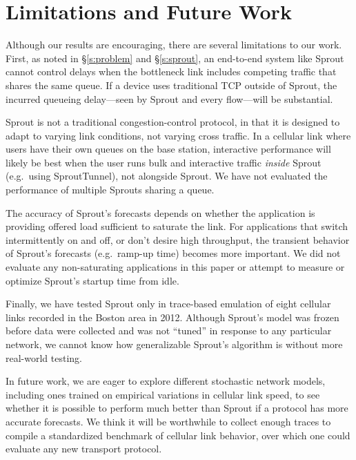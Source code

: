 \section{Limitations and Future Work}

Although our results are encouraging, there are several limitations to
our work. First, as noted in \S\ref{s:problem} and \S\ref{s:sprout},
an end-to-end system like Sprout cannot control delays when the
bottleneck link includes competing traffic that shares the same
queue. If a device uses traditional TCP outside of Sprout, the
incurred queueing delay---seen by Sprout and every flow---will be
substantial.

Sprout is not a traditional congestion-control protocol, in that it is
designed to adapt to varying link conditions, not varying cross
traffic. In a cellular link where users have their own queues on the
base station, interactive performance will likely be best when the
user runs bulk and interactive traffic \emph{inside} Sprout
(e.g.~using SproutTunnel), not alongside Sprout. We have not evaluated
the performance of multiple Sprouts sharing a queue.

The accuracy of Sprout's forecasts depends on whether the application
is providing offered load sufficient to saturate the link. For
applications that switch intermittently on and off, or don't desire
high throughput, the transient behavior of Sprout's forecasts
(e.g.~ramp-up time) becomes more important. We did not evaluate any
non-saturating applications in this paper or attempt to measure or optimize
Sprout's startup time from idle.

Finally, we have tested Sprout only in trace-based emulation of eight
cellular links recorded in the Boston area in 2012. Although Sprout's
model was frozen before data were collected and was not ``tuned'' in
response to any particular network, we cannot know how generalizable
Sprout's algorithm is without more real-world testing.

In future work, we are eager to explore different stochastic network
models, including ones trained on empirical variations in cellular
link speed, to see whether it is possible to perform much better than
Sprout if a protocol has more accurate forecasts. We think it will be
worthwhile to collect enough traces to compile a standardized
benchmark of cellular link behavior, over which one could evaluate any
new transport protocol.
